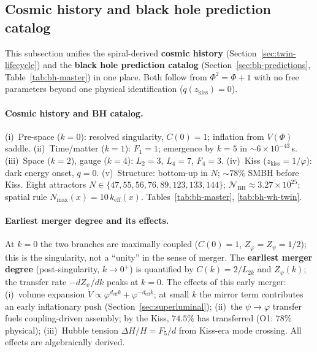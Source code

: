 \documentclass[12pt,a4paper]{article}
\begin{document}
\subsection{Cosmic history and black hole prediction catalog}
\label{sec:cosmic-history-bh-catalog}

This subsection unifies the spiral-derived \textbf{cosmic history} (Section~\ref{sec:twin-lifecycle}) and the \textbf{black hole prediction catalog} (Section~\ref{sec:bh-predictions}, Table~\ref{tab:bh-master}) in one place. Both follow from $\Phi^2 = \Phi + 1$ with no free parameters beyond one physical identification ($q(z_{\mathrm{kiss}}) = 0$).

\paragraph{Cosmic history and BH catalog.}
(i)~Pre-space ($k{=}0$): resolved singularity, $C(0){=}1$; inflation from $V(\Phi)$ saddle. (ii)~Time/matter ($k{=}1$): $F_1{=}1$; emergence by $k{=}5$ in $\sim 6{\times}10^{-43}$\,s. (iii)~Space ($k{=}2$), gauge ($k{=}4$): $L_2{=}3$, $L_4{=}7$, $F_4{=}3$. (iv)~Kiss ($z_{\mathrm{kiss}}{=}1/\varphi$): dark energy onset, $q{=}0$. (v)~Structure: bottom-up in $N$; $\sim 78\%$ SMBH before Kiss. Eight attractors $N \in \{47,55,56,76,89,123,133,144\}$; $\mathcal{N}_{\mathrm{BH}} \approx 3.27 \times 10^{25}$; spatial rule $N_{\max}(x) = 10\,k_{\mathrm{eff}}(x)$. Tables~\ref{tab:bh-master}, \ref{tab:bh-wh-twin}.

\paragraph{Earliest merger degree and its effects.}
At $k = 0$ the two branches are maximally coupled ($C(0) = 1$, $Z_\varphi = Z_\psi = 1/2$); this is the singularity, not a ``unity'' in the sense of merger. The \textbf{earliest merger degree} (post-singularity, $k \to 0^+$) is quantified by $C(k) = 2/L_{2k}$ and $Z_\psi(k)$; the transfer rate $-dZ_\psi/dk$ peaks at $k = 0$. The effects of this early merger: (i)~volume expansion $\dot{V} \propto \varphi^{d_{\mathrm{eff}}k} + \varphi^{-d_{\mathrm{eff}}k}$; at small $k$ the mirror term contributes an early inflationary push (Section~\ref{sec:superluminal}); (ii)~the $\psi \to \varphi$ transfer fuels coupling-driven assembly; by the Kiss, $74.5\%$ has transferred (O1: $78\%$ physical); (iii)~Hubble tension $\Delta H/H = F_5/d$ from Kiss-era mode crossing. All effects are algebraically derived.
\end{document}
